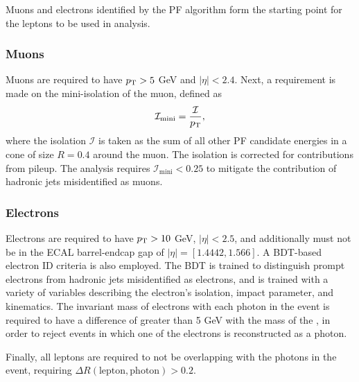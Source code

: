 Muons and electrons identified by the PF algorithm form the starting point for the leptons to be used in analysis.
\subsubsection*{Muons}
Muons are required to have $p_{\mathrm{T}} > 5$ GeV and $|\eta| < 2.4$.
Next, a requirement is made on the mini-isolation of the muon, defined as
\begin{equation}
\mathcal I_{\text{mini}} = \frac{\mathcal I}{p_{\mathrm{T}}},
\end{equation}
where the isolation $\mathcal I$ is taken as the sum of all other PF candidate energies in a cone of size $R=0.4$ around the muon.
The isolation is corrected for contributions from pileup.
The \ttH analysis requires $\mathcal I_{\text{mini}} < 0.25$ to mitigate the contribution of hadronic jets misidentified as muons.
\subsubsection*{Electrons}
Electrons are required to have $p_{\mathrm{T}} > 10$ GeV, $|\eta| < 2.5$, and additionally must not be in the ECAL barrel-endcap gap of $|\eta| = [1.4442, 1.566]$.
A BDT-based electron ID criteria is also employed.
The BDT is trained to distinguish prompt electrons from hadronic jets misidentified as electrons, and is trained with a variety of variables describing the electron's isolation, impact parameter, and kinematics.
The invariant mass of electrons with each photon in the event is required to have a difference of greater than 5 GeV with the mass of the \PZ, in order to reject \Zee events in which one of the electrons is reconstructed as a photon.

Finally, all leptons are required to not be overlapping with the photons in the event, requiring $\Delta R(\text{lepton}, \text{photon}) > 0.2$.
